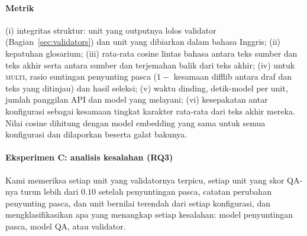 \paragraph{Metrik}
(i) integritas struktur: unit yang outputnya lolos validator (Bagian~\ref{sec:validators}) dan unit yang dibiarkan dalam bahasa Inggris; (ii) kepatuhan glosarium; (iii) rata-rata cosine lintas bahasa antara teks sumber dan teks akhir serta antara sumber dan terjemahan balik dari teks akhir; (iv) untuk \textsc{multi}, rasio suntingan penyunting pasca ($1-$ kesamaan difflib antara draf dan teks yang ditinjau) dan hasil seleksi; (v) waktu dinding, detik-model per unit, jumlah panggilan API dan model yang melayani; (vi) kesepakatan antar konfigurasi sebagai kesamaan tingkat karakter rata-rata dari teks akhir mereka. Nilai cosine dihitung dengan model embedding yang sama untuk semua konfigurasi dan dilaporkan beserta galat bakunya.

\paragraph{Eksperimen C: analisis kesalahan (RQ3)}
Kami memeriksa setiap unit yang validatornya terpicu, setiap unit yang skor QA-nya turun lebih dari $0.10$ setelah penyuntingan pasca, catatan perubahan penyunting pasca, dan unit bernilai terendah dari setiap konfigurasi, dan mengklasifikasikan apa yang menangkap setiap kesalahan: model penyuntingan pasca, model QA, atau validator.
